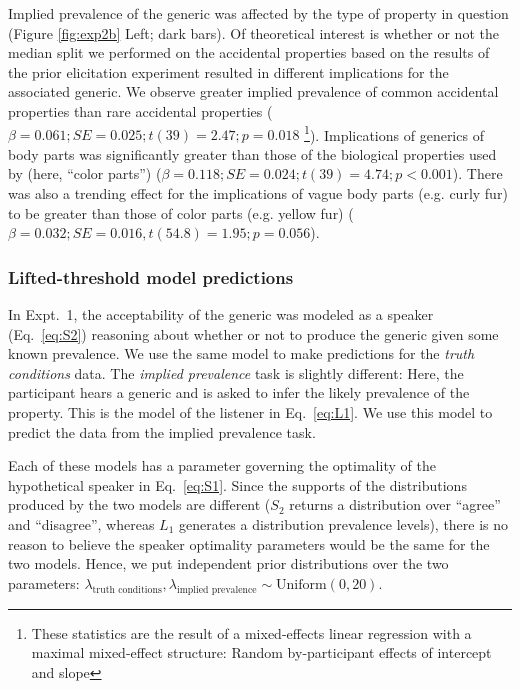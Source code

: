 \documentclass[10pt,letterpaper]{article}
\begin{document}
Implied prevalence of the generic was affected by the type of property in question (Figure \ref{fig:exp2b} Left; dark bars). 
Of theoretical interest is whether or not the median split we performed on the accidental properties based on the results of the prior elicitation experiment resulted in different implications for the associated generic.
We observe  greater implied prevalence of common accidental properties than rare accidental properties ($\beta=0.061; SE = 0.025; t(39) = 2.47; p = 0.018$ \footnote{These statistics are the result of a mixed-effects linear regression with a maximal mixed-effect structure: Random by-participant effects of intercept and slope}).
Implications of generics of body parts was significantly greater than those of the biological properties used by  (here, ``color parts'') ($\beta=0.118; SE = 0.024; t(39) = 4.74; p < 0.001$).
There was also a trending effect for the implications of vague body parts (e.g. curly fur) to be greater than those of color parts (e.g. yellow fur) ($\beta=0.032; SE = 0.016, t(54.8) = 1.95; p = 0.056$).



\subsubsection{Lifted-threshold model predictions}

In Expt.~1, the acceptability of the generic was modeled as a speaker (Eq.~\ref{eq:S2}) reasoning about whether or not to produce the generic given some known prevalence. 
We use the same model to make predictions for the \emph{truth conditions} data.
The \emph{implied prevalence} task is slightly different: Here, the participant hears a generic and is asked to infer the likely prevalence of the property. 
This is the model of the listener in Eq.~\ref{eq:L1}. 
We use this model to predict the data from the implied prevalence task.

Each of these models has a parameter governing the optimality of the hypothetical speaker in Eq.~\ref{eq:S1}. 
Since the supports of the distributions produced by the two models are different ($S_2$ returns a distribution over ``agree'' and ``disagree'', whereas $L_1$ generates a distribution prevalence levels), there is no reason to believe the speaker optimality parameters would be the same for the two models. 
Hence, we put independent prior distributions over the two parameters: $\lambda_{\text{truth conditions}}, \lambda_{\text{implied prevalence}} \sim \text{Uniform}(0, 20)$.
\end{document}
